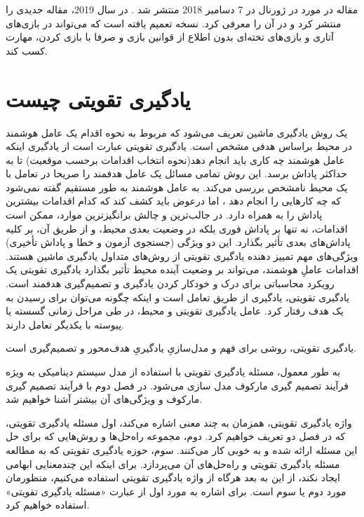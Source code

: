 مقاله
  در مورد
    در ژورنال
در 7 دسامبر 2018 منتشر شد
\cite{silver2018general}.
در سال 2019،
مقاله جدیدی را منتشر کرد و در آن
را معرفی کرد. 
نسخه تعمیم یافته 
است که می‌تواند در بازی‌های آتاری و بازی‌های تخته‌ای 
 بدون اطلاع از قوانین بازی و صرفا با بازی کردن، مهارت کسب کند.

\section{یادگیری تقویتی چیست}
یک روش یادگیری ماشین تعریف می‌شود که مربوط به نحوه اقدام یک عامل هوشمند  در محیط براساس هدفی مشخص است. یادگیری تقویتی عبارت است از یادگیری اینکه عامل هوشمند چه کاری باید انجام دهد(نحوه انتخاب اقدامات برحسب موقعیت) تا به حداکثر پاداش برسد. این روش تمامی‌ مسائل یک عامل هدفمند را صریحا در تعامل با یک محیط نامشخص بررسی می‌کند. به عامل هوشمند به طور مستقیم گفته نمی‌شود که چه کارهایی را انجام دهد ، اما درعوض باید کشف کند که کدام اقدامات بیشترین پاداش را به همراه دارد. در جالب‌ترین و چالش برانگیزترین موارد، ممکن است اقدامات، نه تنها بر پاداش فوری بلکه در وضعیت بعدی محیط، و از طریق آن، بر کلیه پاداش‌های بعدی تأثیر بگذارد. این دو ویژگی (جستجوی آزمون و خطا و پاداش تأخیری) ویژگی‌های مهم تمییز دهنده یادگیری تقویتی از روش‌های متداول یادگیری ماشین هستند.
اقدامات عاملِ هوشمند، می‌تواند بر وضعیت آینده محیط تأثیر بگذارد
یادگیری تقویتی یک رویکرد محاسباتی برای درک و خودکار کردن یادگیری و تصمیم‌گیری هدفمند است.
یادگیری تقویتی، یادگیری از  طریق تعامل است و اینکه چگونه می‌توان برای رسیدن به یک هدف رفتار کرد.
عامل یادگیری تقویتی و محیط، در طی مراحل زمانی گسسته یا پیوسته با یکدیگر تعامل دارند.

یادگیری تقویتی، روشی برای فهم و مدل‌سازیِ یادگیریِ هدف‌محور و تصمیم‌گیری است.


به طور معمول، مسئله یادگیری تقویتی با استفاده از مدل سیستم دینامیکی به ویژه فرآیند تصمیم گیری مارکوف مدل سازی می‌شود. در فصل دوم با فرآیند تصمیم گیری مارکوف و ویژگی‌های آن بیشتر آشنا خواهیم شد.

واژه یادگیری تقویتی، همزمان به چند معنی اشاره می‌کند، اول مسئله یادگیری تقویتی، که در فصل دو تعریف خواهیم کرد. دوم، مجموعه راه‌حل‌ها و روش‌هایی که برای حل این مسئله ارائه شده و به خوبی کار می‌کنند. سوم، حوزه یادگیری تقویتی که به مطالعه مسئله یادگیری تقویتی و راه‌حل‌های آن می‌پردازد. برای اینکه این چندمعنایی ابهامی ایجاد نکند، از این به بعد هرگاه از واژه یادگیری تقویتی استفاده می‌کنیم، منظورمان  مورد دوم یا سوم است. برای اشاره به مورد اول از عبارت «مسئله یادگیری تقویتی» استفاده خواهیم کرد. 



